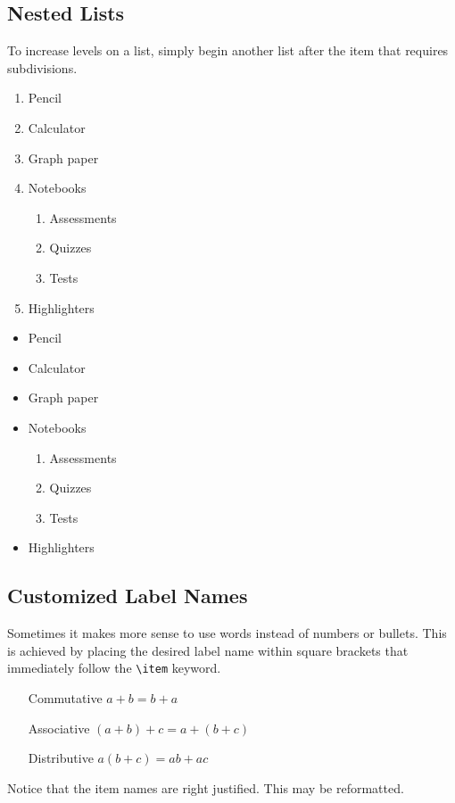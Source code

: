 \documentclass[11pt]{article}
\begin{document}
\subsection{Nested Lists}
To increase levels on a list, simply begin another list after the item that requires subdivisions. 
\begin{enumerate}
	\item Pencil
	\item Calculator
	\item Graph paper
	\item Notebooks
		\begin{enumerate}
			\item Assessments
			\item Quizzes
			\item Tests
		\end{enumerate}
	\item Highlighters
\end{enumerate}
\dotfill
\begin{itemize}
	\item Pencil
	\item Calculator
	\item Graph paper
	\item Notebooks
		\begin{enumerate}
			\item Assessments
			\item Quizzes
			\item Tests
		\end{enumerate}
	\item Highlighters
\end{itemize}

\subsection{Customized Label Names}
Sometimes it makes more sense to use words instead of numbers or bullets. This is achieved by placing the desired label name within square brackets that immediately follow the \texttt{\textbackslash item} keyword. 

\begin{itemize}
	\item[Commutative] $a+b=b+a$
	\item[Associative] $(a+b)+c=a+(b+c)$
	\item[Distributive] $a(b+c)=ab+ac$
\end{itemize}

Notice that the item names are right justified. This may be reformatted. 
\end{document}
